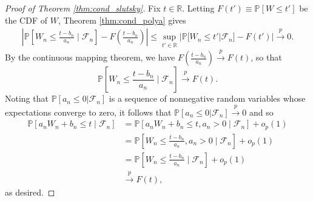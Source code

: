 \documentclass[aos]{imsart}
\theoremstyle{definition}
\theoremstyle{remark}
\renewcommand{\P}{\mathbb{P}}							%
\newcommand{\R}{\mathbb{R}}								%
\newcommand{\convp}{\overset p \rightarrow}             %
\begin{document}
	\begin{proof}[Proof of Theorem \ref{thm:cond_slutsky}]
		Fix $t \in \R$. Letting $F(t') \equiv \P[W \leq t']$ be the CDF of $W$, Theorem \ref{thm:cond_polya} gives 
		\begin{align*}
			\left|\P\left[W_n\leq \frac{t - b_n}{a_n}\mid\mathcal{F}_n\right]-F\left(\frac{t - b_n}{a_n}\right)\right| \leq	\sup_{t' \in \R}|\P[W_n\leq t'|\mathcal{F}_n]-F(t')|\convp0.
		\end{align*}
		By the continuous mapping theorem, we have $F\left(\frac{t - b_n}{a_n}\right) \convp F(t)$, so that
		\begin{equation*}
			\P\left[W_n\leq \frac{t - b_n}{a_n}\mid\mathcal{F}_n\right] \convp F(t).
		\end{equation*}
		Noting that $\P[a_n \leq 0 | \mathcal F_n]$ is a sequence of nonnegative random variables whose expectations converge to zero, it follows that $\P[a_n \leq 0 | \mathcal F_n] \convp 0$ and so
		\begin{equation*}
			\begin{split}
				\P\left[a_nW_n + b_n \leq t \mid\mathcal{F}_n\right] &= \P\left[a_nW_n + b_n \leq t, a_n > 0\mid\mathcal{F}_n\right] + o_p(1) \\
				&= \P\left[W_n\leq \frac{t - b_n}{a_n}, a_n > 0\mid\mathcal{F}_n\right] + o_p(1) \\
				&= \P\left[W_n\leq \frac{t - b_n}{a_n}\mid\mathcal{F}_n\right] + o_p(1) \\
				&\convp F(t),
			\end{split}
		\end{equation*}
		as desired.
	\end{proof}
	
\end{document}
